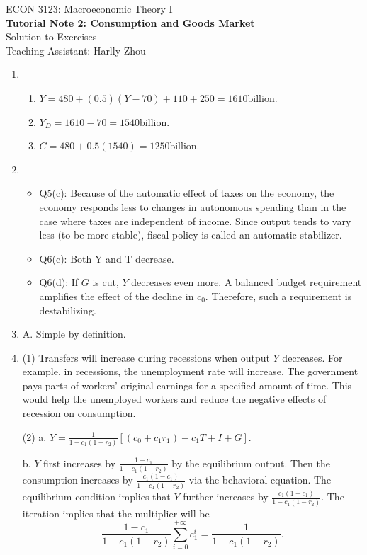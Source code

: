 \documentclass[12pt]{article}
\numberwithin{equation}{section}
\begin{document}
\begin{center}
    ECON 3123: Macroeconomic Theory I\\
    {\large \textbf{Tutorial Note 2: Consumption and Goods Market}}\\
    Solution to Exercises\\
    Teaching Assistant: Harlly Zhou
\end{center}

\begin{enumerate}[label=\arabic*.]
    \item \begin{enumerate}[label=\alph*.]
        \item $Y=480+(0.5)(Y-70)+110+250=1610\text{billion}$.
        \item $Y_D = 1610 - 70 = 1540\text{billion}$.
        \item $C = 480 + 0.5(1540) = 1250 \text{billion}$.
        \end{enumerate}
    \item \begin{itemize}
        \item Q5(c): Because of the automatic effect of taxes on the economy, the economy responds less to changes in autonomous spending than in the case where taxes are independent of income. Since output tends to vary less (to be more stable), fiscal policy is called an automatic stabilizer.
        \item Q6(c): Both Y and T decrease.
        \item Q6(d): If $G$ is cut, $Y$ decreases even more. A balanced budget requirement amplifies the effect of the decline in $c_0$. Therefore, such a requirement is destabilizing.
        \end{itemize}
    \item A. Simple by definition.
    \item (1) Transfers will increase during recessions when output $Y$ decreases. For example, in recessions, the unemployment rate will increase. The government pays parts of workers' original earnings for a specified amount of time. This would help the unemployed workers and reduce the negative effects of recession on consumption.

    (2) a. $Y = \frac{1}{1-c_1(1-r_2)}[(c_0+c_1r_1) - c_1 T + I + G]$.

    b. $Y$ first increases by $\frac{1-c_1}{1-c_1(1-r_2)}$ by the equilibrium output. Then the consumption increases by $\frac{c_1(1-c_1)}{1-c_1(1-r_2)}$ via the behavioral equation. The equilibrium condition implies that $Y$ further increases by $\frac{c_1(1-c_1)}{1-c_1(1-r_2)}$. The iteration implies that the multiplier will be
    \[\frac{1-c_1}{1-c_1(1-r_2)} \sum_{i=0}^{+\infty} c_1^i = \frac{1}{1-c_1(1-r_2)}.\]
    

\end{enumerate}
\end{document}
